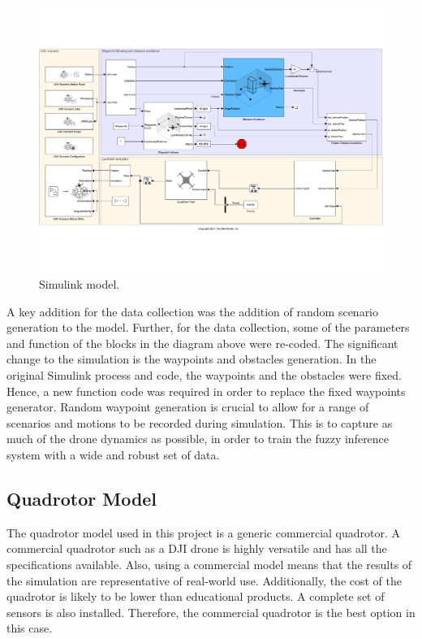 \begin{figure}[H]
    \centering
    \includegraphics[width =\textwidth]{img/simulink_model.pdf}
    \caption{Simulink model.}
    \label{fig:sim1}
\end{figure}
A key addition for the data collection was the addition of random scenario generation to the model. Further, for the data collection, some of the parameters and function of the blocks in the diagram above were re-coded. The significant change to the simulation is the waypoints and obstacles generation. In the original Simulink process and code, the waypoints and the obstacles were fixed. Hence, a new function code was required in order to replace the fixed waypoints generator. Random waypoint generation is crucial to allow for a range of scenarios and motions to be recorded during simulation. This is to capture as much of the drone dynamics as possible, in order to train the fuzzy inference system with a wide and robust set of data.
\subsection{Quadrotor Model}
The quadrotor model used in this project is a generic commercial quadrotor. A commercial quadrotor such as a DJI drone is highly versatile and has all the specifications available. Also, using a commercial model means that the results of the simulation are representative of real-world use. Additionally, the cost of the quadrotor is likely to be lower than educational products. A complete set of sensors is also installed. Therefore, the commercial quadrotor is the best option in this case.

